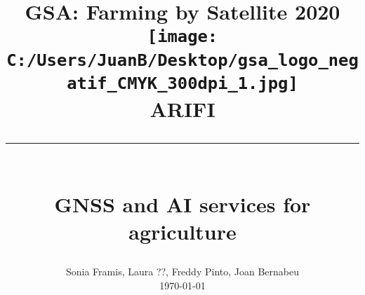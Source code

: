 \documentclass[12pt]{article}
\begin{document}
	
\title{%
	\vspace{-3cm}
	\Large
	\textbf{GSA: Farming by Satellite 2020}\\
		\vspace{1cm}
		\texttt{[image: C:/Users/JuanB/Desktop/gsa\_logo\_negatif\_CMYK\_300dpi\_1.jpg]}\\
	\vspace{3cm}
	\huge
	\textbf{ARIFI}
	\rule[0.7cm]{\textwidth}{0.4pt}\\
	\huge
	\vspace{-0.7cm}
	GNSS and AI services for agriculture\\
}

\date{%
	\vspace{7cm}
	Sonia Framis, Laura ??, Freddy Pinto, Joan Bernabeu\\
	\vspace{0.5cm}
	\today}
\maketitle
{}




\end{document}
